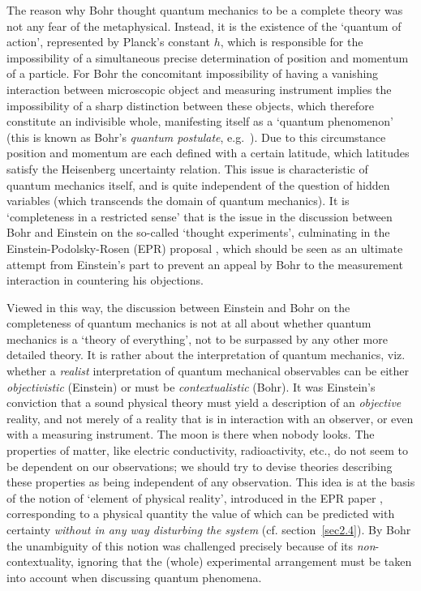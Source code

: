 \documentclass[12pt]{article}
\begin{document}
\noindent
The reason why Bohr thought quantum mechanics to be a complete
theory was not any fear of the metaphysical. Instead, it is the
existence of the `quantum of action', represented by Planck's
constant $h$, which is responsible for the impossibility of a
simultaneous precise determination of position and momentum of a
particle. For Bohr the concomitant impossibility of having a
vanishing interaction between microscopic object and measuring
instrument implies the impossibility of a sharp distinction
between these objects, which therefore constitute an indivisible
whole, manifesting itself as a `quantum phenomenon' (this is known
as Bohr's {\em quantum postulate}, e.g.~\cite{Bohr49}). Due to
this circumstance position and momentum are each defined with a
certain latitude, which latitudes satisfy the Heisenberg
uncertainty relation. This issue is characteristic of quantum
mechanics itself, and is quite independent of the question of
hidden variables (which transcends the domain of quantum
mechanics). It is `completeness in a restricted sense' that is the
issue in the discussion between Bohr and Einstein on the so-called
`thought experiments', culminating in the Einstein-Podolsky-Rosen
(EPR) proposal \cite{EPR}, which should be seen as an ultimate
attempt from Einstein's part to prevent an appeal by Bohr to the
measurement interaction in countering his objections.

Viewed in this way, the discussion between Einstein and Bohr on
the completeness of quantum mechanics is not at all about whether
quantum mechanics is a `theory of everything', not to be surpassed
by any other more detailed theory. It is rather about the
interpretation of quantum mechanics, viz. whether a {\em realist}
interpretation of quantum mechanical observables can be either
{\em objectivistic} (Einstein) or must be {\em contextualistic}
(Bohr). It was Einstein's conviction that a sound physical theory
must yield a description of an {\em objective} reality, and not
merely of a reality that is in interaction with an observer, or
even with a measuring instrument. The moon is there when nobody
looks. The properties of matter, like electric conductivity,
radioactivity, etc., do not seem to be dependent on our
observations; we should try to devise theories describing these
properties as being independent of any observation. This idea is
at the basis of the notion of `element of physical reality',
introduced in the EPR paper \cite{EPR}, corresponding to a
physical quantity the value of which can be predicted with
certainty {\em without in any way disturbing the system} (cf.
section~\ref{sec2.4}). By Bohr \cite{Bohr35} the unambiguity of
this notion was challenged precisely because of its {\em
non}-contextuality, ignoring that the (whole) experimental arrangement
must be taken into account when discussing quantum phenomena.
\end{document}

